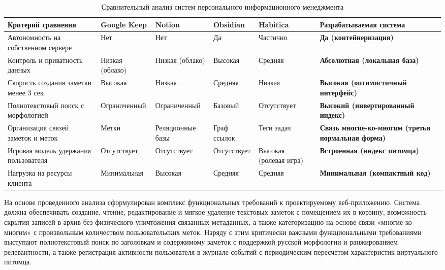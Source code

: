 \documentclass[a4paper,14pt]{extreport}
\begin{document}
\begin{table}[H]
  \centering
  \caption{Сравнительный анализ систем персонального информационного менеджмента}
  \label{tab:analogs}
  \fontsize{10.5pt}{13.5pt}\selectfont
  \begin{tabularx}{\textwidth}{|>{\raggedright\arraybackslash}X|>{\centering\arraybackslash}p{22mm}|>{\centering\arraybackslash}p{18mm}|>{\centering\arraybackslash}p{20mm}|>{\centering\arraybackslash}p{20mm}|>{\centering\arraybackslash}p{28mm}|}
  \hline
  \textbf{Критерий сравнения} & \textbf{Google Keep} & \textbf{Notion} & \textbf{Obsidian} & \textbf{Habitica} & \textbf{Разрабатываемая система} \\
  \hline
  Автономность на собственном сервере & Нет & Нет & Да & Частично & \textbf{Да (контейнеризация)} \\
  \hline
  Контроль и приватность данных & Низкая (облако) & Низкая (облако) & Высокая & Средняя & \textbf{Абсолютная (локальная база)} \\
  \hline
  Скорость создания заметки менее 3 сек & Высокая & Низкая & Средняя & Низкая & \textbf{Высокая (оптимистичный интерфейс)} \\
  \hline
  Полнотекстовый поиск с морфологией & Ограниченный & Ограниченный & Базовый & Отсутствует & \textbf{Высокий (инвертированный индекс)} \\
  \hline
  Организация связей заметок и меток & Метки & Реляционные базы & Граф ссылок & Теги задач & \textbf{Связь многие-ко-многим (третья нормальная форма)} \\
  \hline
  Игровая модель удержания пользователя & Отсутствует & Отсутствует & Отсутствует & Высокая (ролевая игра) & \textbf{Встроенная (индекс питомца)} \\
  \hline
  Нагрузка на ресурсы клиента & Минимальная & Высокая & Средняя & Средняя & \textbf{Минимальная (компактный код)} \\
  \hline
  \end{tabularx}
\end{table}

На основе проведенного анализа сформулирован комплекс функциональных требований к проектируемому веб-приложению. Система должна обеспечивать создание, чтение, редактирование и мягкое удаление текстовых заметок с помещением их в корзину, возможность скрытия записей в архив без физического уничтожения связанных метаданных, а также категоризацию на основе связи «многие ко многим» с произвольным количеством пользовательских меток. Наряду с этим критически важными функциональными требованиями выступают полнотекстовый поиск по заголовкам и содержимому заметок с поддержкой русской морфологии и ранжированием релевантности, а также регистрация активности пользователя в журнале событий с периодическим пересчетом характеристик виртуального питомца.
\end{document}
